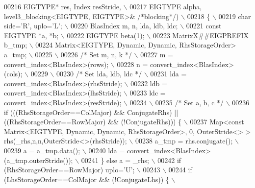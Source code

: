 \begin{DoxyCode}
00216 \textcolor{preprocessor}{    EIGTYPE* res,        Index resStride, \(\backslash\)}
00217 \textcolor{preprocessor}{    EIGTYPE alpha, level3\_blocking<EIGTYPE, EIGTYPE>& }\textcolor{comment}{/*blocking*/}\textcolor{preprocessor}{) \(\backslash\)}
00218 \textcolor{preprocessor}{  \{ \(\backslash\)}
00219 \textcolor{preprocessor}{    char side='R', uplo='L'; \(\backslash\)}
00220 \textcolor{preprocessor}{    BlasIndex m, n, lda, ldb, ldc; \(\backslash\)}
00221 \textcolor{preprocessor}{    const EIGTYPE *a, *b; \(\backslash\)}
00222 \textcolor{preprocessor}{    EIGTYPE beta(1); \(\backslash\)}
00223 \textcolor{preprocessor}{    MatrixX##EIGPREFIX b\_tmp; \(\backslash\)}
00224 \textcolor{preprocessor}{    Matrix<EIGTYPE, Dynamic, Dynamic, RhsStorageOrder> a\_tmp; \(\backslash\)}
00225 \textcolor{preprocessor}{\(\backslash\)}
00226 \textcolor{preprocessor}{}\textcolor{comment}{/* Set m, n, k */}\textcolor{preprocessor}{ \(\backslash\)}
00227 \textcolor{preprocessor}{    m = convert\_index<BlasIndex>(rows); \(\backslash\)}
00228 \textcolor{preprocessor}{    n = convert\_index<BlasIndex>(cols); \(\backslash\)}
00229 \textcolor{preprocessor}{\(\backslash\)}
00230 \textcolor{preprocessor}{}\textcolor{comment}{/* Set lda, ldb, ldc */}\textcolor{preprocessor}{ \(\backslash\)}
00231 \textcolor{preprocessor}{    lda = convert\_index<BlasIndex>(rhsStride); \(\backslash\)}
00232 \textcolor{preprocessor}{    ldb = convert\_index<BlasIndex>(lhsStride); \(\backslash\)}
00233 \textcolor{preprocessor}{    ldc = convert\_index<BlasIndex>(resStride); \(\backslash\)}
00234 \textcolor{preprocessor}{\(\backslash\)}
00235 \textcolor{preprocessor}{}\textcolor{comment}{/* Set a, b, c */}\textcolor{preprocessor}{ \(\backslash\)}
00236 \textcolor{preprocessor}{    if (((RhsStorageOrder==ColMajor) && ConjugateRhs) || ((RhsStorageOrder==RowMajor) && (!ConjugateRhs)))
       \{ \(\backslash\)}
00237 \textcolor{preprocessor}{      Map<const Matrix<EIGTYPE, Dynamic, Dynamic, RhsStorageOrder>, 0, OuterStride<> >
       rhs(\_rhs,n,n,OuterStride<>(rhsStride)); \(\backslash\)}
00238 \textcolor{preprocessor}{      a\_tmp = rhs.conjugate(); \(\backslash\)}
00239 \textcolor{preprocessor}{      a = a\_tmp.data(); \(\backslash\)}
00240 \textcolor{preprocessor}{      lda = convert\_index<BlasIndex>(a\_tmp.outerStride()); \(\backslash\)}
00241 \textcolor{preprocessor}{    \} else a = \_rhs; \(\backslash\)}
00242 \textcolor{preprocessor}{    if (RhsStorageOrder==RowMajor) uplo='U'; \(\backslash\)}
00243 \textcolor{preprocessor}{\(\backslash\)}
00244 \textcolor{preprocessor}{    if (LhsStorageOrder==ColMajor && (!ConjugateLhs)) \{ \(\backslash\)}

\end{DoxyCode}
